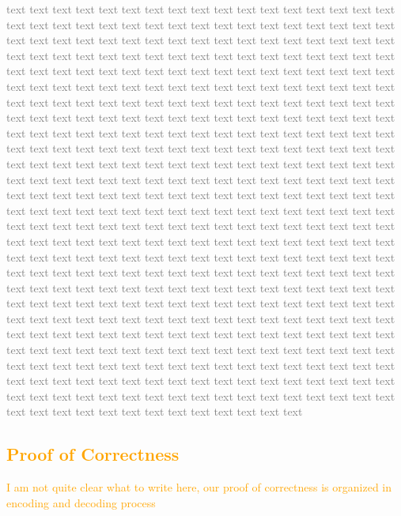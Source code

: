 \documentclass[sigconf]{acmart}
\begin{document}
\textcolor{gray}{
    text text text text text text text text text text text text text text text text text text text text text text text text text text text text text text text text text text text text text text text text text text text text text text text text text text text text text text text text text text text text text text text text text text text text text text text text text text text text text text text text text text text text text text text text text text text text text text text text text text text text text text text text text text text text text text text text text text text text text text text text text text text text text text text text text text text text text text text text text text text text text text text text text text text text text text text text text text text text text text text text text text text text text text text text text text text text text text text text text text text text text text text text text text text text text text text text text text text text text text text text text text text text text text text text text text text text text text text text text text text text text text text text text text text text text text text text text text text text text text text text text text text text text text text text text text text text text text text text text text text text text text text text text text text text text text text text text text text text text text text text text text text text text text text text text text text text text text text text text text text text text text text text text text text text text text text text text text text text text text text text text text text text text text text text text text text text text text text text text text text text text text text text text text text text text text text text text text text text text text text text text text text text text text text text text text text text text text text text text text text text text text text text text text text text text text text text text text text text text text text text text text text text text text text text text text text text text text text text text text text text text text text text text text text text text text text text text text text text text text text text text text text text text text text text text text text text text text text 
}

\subsection{\textcolor{orange}{Proof of Correctness}}
\textcolor{orange}{I am not quite clear what to write here, our proof of correctness is organized in encoding and decoding process}
\end{document}
